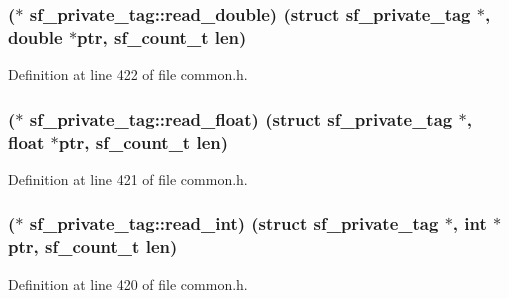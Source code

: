 \subsubsection[{\texorpdfstring{read\+\_\+double}{read_double}}]{($\ast$ sf\+\_\+private\+\_\+tag\+::read\+\_\+double) (struct {\bf sf\+\_\+private\+\_\+tag} $\ast$, double $\ast$ptr, {\bf sf\+\_\+count\+\_\+t} {\bf len})}\hypertarget{structsf__private__tag_a70b02cbeb50a539b35752b57512fab1b}{}\label{structsf__private__tag_a70b02cbeb50a539b35752b57512fab1b}


Definition at line 422 of file common.\+h.

\subsubsection[{\texorpdfstring{read\+\_\+float}{read_float}}]{($\ast$ sf\+\_\+private\+\_\+tag\+::read\+\_\+float) (struct {\bf sf\+\_\+private\+\_\+tag} $\ast$, float $\ast$ptr, {\bf sf\+\_\+count\+\_\+t} {\bf len})}\hypertarget{structsf__private__tag_a43a78efc967ec86bee19dea5bda1d06b}{}\label{structsf__private__tag_a43a78efc967ec86bee19dea5bda1d06b}


Definition at line 421 of file common.\+h.

\subsubsection[{\texorpdfstring{read\+\_\+int}{read_int}}]{($\ast$ sf\+\_\+private\+\_\+tag\+::read\+\_\+int) (struct {\bf sf\+\_\+private\+\_\+tag} $\ast$, {\bf int} $\ast$ptr, {\bf sf\+\_\+count\+\_\+t} {\bf len})}\hypertarget{structsf__private__tag_a7ffead80fd790ded8757932ca0288cf3}{}\label{structsf__private__tag_a7ffead80fd790ded8757932ca0288cf3}


Definition at line 420 of file common.\+h.

